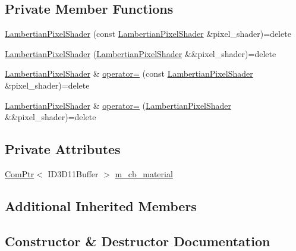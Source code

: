 \subsection*{Private Member Functions}
\begin{DoxyCompactItemize}
\item 
\hyperlink{classmage_1_1_lambertian_pixel_shader_a0e7a36645bb7e1fa9bd481575886ddad}{Lambertian\+Pixel\+Shader} (const \hyperlink{classmage_1_1_lambertian_pixel_shader}{Lambertian\+Pixel\+Shader} \&pixel\+\_\+shader)=delete
\item 
\hyperlink{classmage_1_1_lambertian_pixel_shader_aca051307ad7fac78bbc8a87c80387960}{Lambertian\+Pixel\+Shader} (\hyperlink{classmage_1_1_lambertian_pixel_shader}{Lambertian\+Pixel\+Shader} \&\&pixel\+\_\+shader)=delete
\item 
\hyperlink{classmage_1_1_lambertian_pixel_shader}{Lambertian\+Pixel\+Shader} \& \hyperlink{classmage_1_1_lambertian_pixel_shader_a03ae64ef13e62b33c6b6ac306207a045}{operator=} (const \hyperlink{classmage_1_1_lambertian_pixel_shader}{Lambertian\+Pixel\+Shader} \&pixel\+\_\+shader)=delete
\item 
\hyperlink{classmage_1_1_lambertian_pixel_shader}{Lambertian\+Pixel\+Shader} \& \hyperlink{classmage_1_1_lambertian_pixel_shader_af3fd77b32ff54a932b9c8734446cd5bd}{operator=} (\hyperlink{classmage_1_1_lambertian_pixel_shader}{Lambertian\+Pixel\+Shader} \&\&pixel\+\_\+shader)=delete
\end{DoxyCompactItemize}
\subsection*{Private Attributes}
\begin{DoxyCompactItemize}
\item 
\hyperlink{namespacemage_ae74f374780900893caa5555d1031fd79}{Com\+Ptr}$<$ I\+D3\+D11\+Buffer $>$ \hyperlink{classmage_1_1_lambertian_pixel_shader_aff89982b5f85531515ec2316930b2944}{m\+\_\+cb\+\_\+material}
\end{DoxyCompactItemize}
\subsection*{Additional Inherited Members}


\subsection{Constructor \& Destructor Documentation}
\hypertarget{classmage_1_1_lambertian_pixel_shader_a5f16778caf62403d148bf5edee042935}{}\label{classmage_1_1_lambertian_pixel_shader_a5f16778caf62403d148bf5edee042935} 
